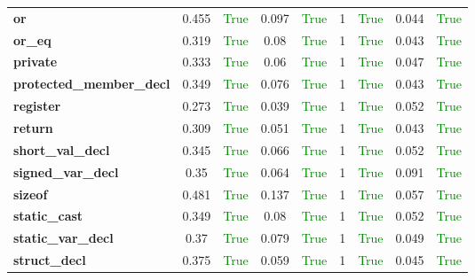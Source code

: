 \documentclass{article}
\begin{document}
\begin{xltabular}{\textwidth}{lcccccccc}
\textbf{{\fontsize{10}{12}\selectfont or}}& 0.455&\textcolor{green}{True}& 0.097&\textcolor{green}{True}& 1&\textcolor{green}{True}& 0.044&\textcolor{green}{True} \\[0.5ex]
\textbf{{\fontsize{10}{12}\selectfont or\_eq}}& 0.319&\textcolor{green}{True}& 0.08&\textcolor{green}{True}& 1&\textcolor{green}{True}& 0.043&\textcolor{green}{True} \\[0.5ex]
\textbf{{\fontsize{10}{12}\selectfont private}}& 0.333&\textcolor{green}{True}& 0.06&\textcolor{green}{True}& 1&\textcolor{green}{True}& 0.047&\textcolor{green}{True} \\[0.5ex]
\textbf{{\fontsize{10}{12}\selectfont protected\_member\_decl}}& 0.349&\textcolor{green}{True}& 0.076&\textcolor{green}{True}& 1&\textcolor{green}{True}& 0.043&\textcolor{green}{True} \\[0.5ex]
\textbf{{\fontsize{10}{12}\selectfont register}}& 0.273&\textcolor{green}{True}& 0.039&\textcolor{green}{True}& 1&\textcolor{green}{True}& 0.052&\textcolor{green}{True} \\[0.5ex]
\textbf{{\fontsize{10}{12}\selectfont return}}& 0.309&\textcolor{green}{True}& 0.051&\textcolor{green}{True}& 1&\textcolor{green}{True}& 0.043&\textcolor{green}{True} \\[0.5ex]
\textbf{{\fontsize{10}{12}\selectfont short\_val\_decl}}& 0.345&\textcolor{green}{True}& 0.066&\textcolor{green}{True}& 1&\textcolor{green}{True}& 0.052&\textcolor{green}{True} \\[0.5ex]
\textbf{{\fontsize{10}{12}\selectfont signed\_var\_decl}}& 0.35&\textcolor{green}{True}& 0.064&\textcolor{green}{True}& 1&\textcolor{green}{True}& 0.091&\textcolor{green}{True} \\[0.5ex]
\textbf{{\fontsize{10}{12}\selectfont sizeof}}& 0.481&\textcolor{green}{True}& 0.137&\textcolor{green}{True}& 1&\textcolor{green}{True}& 0.057&\textcolor{green}{True} \\[0.5ex]
\textbf{{\fontsize{10}{12}\selectfont static\_cast}}& 0.349&\textcolor{green}{True}& 0.08&\textcolor{green}{True}& 1&\textcolor{green}{True}& 0.052&\textcolor{green}{True} \\[0.5ex]
\textbf{{\fontsize{10}{12}\selectfont static\_var\_decl}}& 0.37&\textcolor{green}{True}& 0.079&\textcolor{green}{True}& 1&\textcolor{green}{True}& 0.049&\textcolor{green}{True} \\[0.5ex]
\textbf{{\fontsize{10}{12}\selectfont struct\_decl}}& 0.375&\textcolor{green}{True}& 0.059&\textcolor{green}{True}& 1&\textcolor{green}{True}& 0.045&\textcolor{green}{True} \\[0.5ex]

\end{xltabular}
\end{document}
